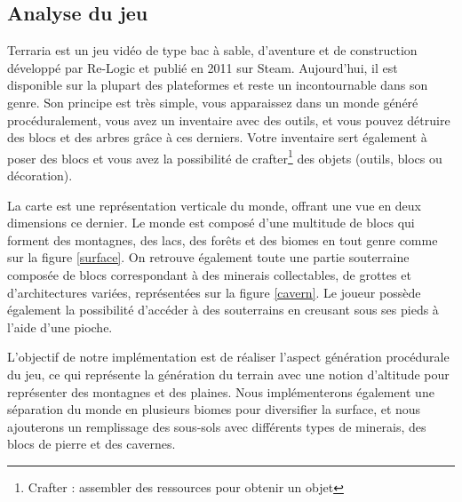 \documentclass[12pt]{article}
\begin{document}
\subsection{Analyse du jeu}

Terraria est un jeu vidéo de type bac à sable, d'aventure et de construction développé par Re-Logic et publié en 2011 sur Steam. Aujourd'hui, il est disponible sur la plupart des plateformes et reste un incontournable dans son genre. Son principe est très simple, vous apparaissez dans un monde généré procéduralement, vous avez un inventaire avec des outils, et vous pouvez détruire des blocs et des arbres grâce à ces derniers. Votre inventaire sert également à poser des blocs et vous avez la possibilité de crafter\footnote{Crafter : assembler des ressources pour obtenir un objet} des objets (outils, blocs ou décoration).\par
La carte est une représentation verticale du monde, offrant une vue en deux dimensions ce dernier. Le monde est composé d'une multitude de blocs qui forment des montagnes, des lacs, des forêts et des biomes en tout genre comme sur la figure \ref{surface}. On retrouve également toute une partie souterraine composée de blocs correspondant à des minerais collectables, de grottes et d'architectures variées, représentées sur la figure \ref{cavern}. Le joueur possède également la possibilité d'accéder à des souterrains en creusant sous ses pieds à l'aide d'une pioche.\par
L'objectif de notre implémentation est de réaliser l'aspect génération procédurale du jeu, ce qui représente la génération du terrain avec une notion d'altitude pour représenter des montagnes et des plaines. Nous implémenterons également une séparation du monde en plusieurs biomes pour diversifier la surface, et nous ajouterons un remplissage des sous-sols avec différents types de minerais, des blocs de pierre et des cavernes.
\vspace{1cm}
\end{document}
